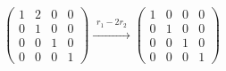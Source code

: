 \documentclass[a4paper]{report}
\begin{document}
\begin{jie}
\begin{align*}
{
\begin{pmatrix}
1&2&0&0\\
0&1&0&0\\
0&0&1&0\\
0&0&0&1
\end{pmatrix}
}\xrightarrow{\substack{r_{1}-2r_{2}}}
{
\begin{pmatrix}
1&0&0&0\\
0&1&0&0\\
0&0&1&0\\
0&0&0&1
\end{pmatrix}
}
\end{align*}
\end{jie}

%
\end{document}
